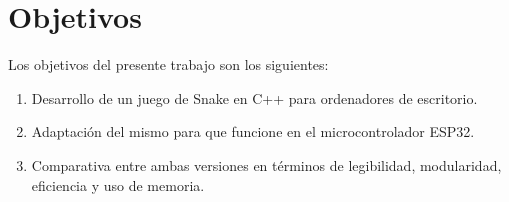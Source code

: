 \section{Objetivos}

Los objetivos del presente trabajo son los siguientes:

\begin{enumerate}
\item Desarrollo de un juego de Snake en C++ para ordenadores de escritorio.

\item Adaptación del mismo para que funcione en el microcontrolador ESP32.

\item Comparativa entre ambas versiones en términos de legibilidad, modularidad, eficiencia y uso de memoria.
\end{enumerate}